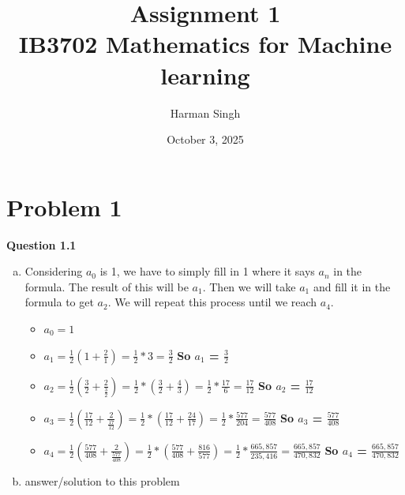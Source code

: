 \documentclass[11pt, a4paper]{article}
\title{Assignment 1 \\ IB3702 Mathematics for Machine learning}
\author{Harman Singh} %
\date{October 3, 2025} %
\begin{document}
\maketitle

\pagebreak
\section*{Problem 1}

\textbf{Question 1.1}
\begin{enumerate}[(a)]
	\item Considering $a_0$ is 1, we have to simply fill in 1 where it says $a_n$ in the formula. The result of this will be $a_1$. Then we will take $a_1$ and fill it in the formula to get $a_2$. We will repeat this process until we reach $a_4$.
	\begin{itemize}
		\item $a_{0} = 1$
		\item $a_{1} = \frac{1}{2} (1             	+ \frac{2}{1          })   	= \frac{1}{2} * 3 = \frac{3}{2}$ 																						\hfill \textbf{So $a_1$ = $\frac{3}{2}$}
		\item $a_{2} = \frac{1}{2} (\frac{3}{2}   	+ \frac{2}{\frac{3}{2}})   	= \frac{1}{2} * (\frac{3}{2} + \frac{4}{3}) = \frac{1}{2} * \frac{17}{6} = \frac{17}{12}$ 								\hfill \textbf{So $a_2$ = $\frac{17}{12}$}
		\item $a_{3} = \frac{1}{2} (\frac{17}{12} 	+ \frac{2}{\frac{17}{12}}) 	= \frac{1}{2} * (\frac{17}{12} + \frac{24}{17}) = \frac{1}{2} * \frac{577}{204} = \frac{577}{408} $ 					\hfill \textbf{So $a_3$ = $\frac{577}{408}$}
		\item $a_{4} = \frac{1}{2} (\frac{577}{408} + \frac{2}{\frac{577}{408}})= \frac{1}{2} * (\frac{577}{408} + \frac{816}{577}) = \frac{1}{2} * \frac{665,857}{235,416} = \frac{665,857}{470,832}$ 	\hfill \textbf{So $a_4$ = $\frac{665,857}{470,832}$}
	\end{itemize}
	
	
	
	\item answer/solution to this problem
	




\end{enumerate}
\end{document}
